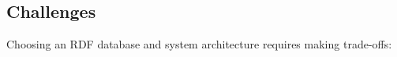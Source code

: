 \subsection{Challenges}
Choosing an RDF database and system architecture requires making trade-offs: 

